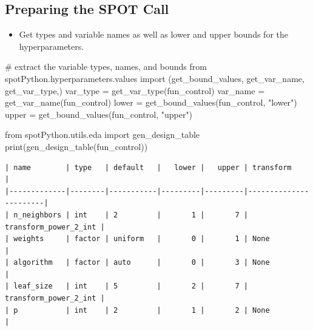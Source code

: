 \documentclass[
  letterpaper,
  DIV=11,
  numbers=noendperiod]{scrreprt}
\newenvironment{Shaded}{\begin{snugshade}}{\end{snugshade}}
\newcommand{\BuiltInTok}[1]{\textcolor[rgb]{0.00,0.23,0.31}{#1}}
\newcommand{\CommentTok}[1]{\textcolor[rgb]{0.37,0.37,0.37}{#1}}
\newcommand{\ImportTok}[1]{\textcolor[rgb]{0.00,0.46,0.62}{#1}}
\newcommand{\NormalTok}[1]{\textcolor[rgb]{0.00,0.23,0.31}{#1}}
\newcommand{\OperatorTok}[1]{\textcolor[rgb]{0.37,0.37,0.37}{#1}}
\newcommand{\StringTok}[1]{\textcolor[rgb]{0.13,0.47,0.30}{#1}}
\providecommand{\tightlist}{%
  \setlength{\itemsep}{0pt}\setlength{\parskip}{0pt}}\usepackage{longtable,booktabs,array}
\begin{document}
\hypertarget{sec-prepare-spot-call-19}{%
\subsection{Preparing the SPOT Call}\label{sec-prepare-spot-call-19}}

\begin{itemize}
\tightlist
\item
  Get types and variable names as well as lower and upper bounds for the
  hyperparameters.
\end{itemize}

\begin{Shaded}
\begin{Highlighting}[]
\CommentTok{\# extract the variable types, names, and bounds}
\ImportTok{from}\NormalTok{ spotPython.hyperparameters.values }\ImportTok{import}\NormalTok{ (get\_bound\_values,}
\NormalTok{    get\_var\_name,}
\NormalTok{    get\_var\_type,)}
\NormalTok{var\_type }\OperatorTok{=}\NormalTok{ get\_var\_type(fun\_control)}
\NormalTok{var\_name }\OperatorTok{=}\NormalTok{ get\_var\_name(fun\_control)}
\NormalTok{lower }\OperatorTok{=}\NormalTok{ get\_bound\_values(fun\_control, }\StringTok{"lower"}\NormalTok{)}
\NormalTok{upper }\OperatorTok{=}\NormalTok{ get\_bound\_values(fun\_control, }\StringTok{"upper"}\NormalTok{)}
\end{Highlighting}
\end{Shaded}

\begin{Shaded}
\begin{Highlighting}[]
\ImportTok{from}\NormalTok{ spotPython.utils.eda }\ImportTok{import}\NormalTok{ gen\_design\_table}
\BuiltInTok{print}\NormalTok{(gen\_design\_table(fun\_control))}
\end{Highlighting}
\end{Shaded}

\begin{verbatim}
| name        | type   | default   |   lower |   upper | transform             |
|-------------|--------|-----------|---------|---------|-----------------------|
| n_neighbors | int    | 2         |       1 |       7 | transform_power_2_int |
| weights     | factor | uniform   |       0 |       1 | None                  |
| algorithm   | factor | auto      |       0 |       3 | None                  |
| leaf_size   | int    | 5         |       2 |       7 | transform_power_2_int |
| p           | int    | 2         |       1 |       2 | None                  |
\end{verbatim}
\end{document}
